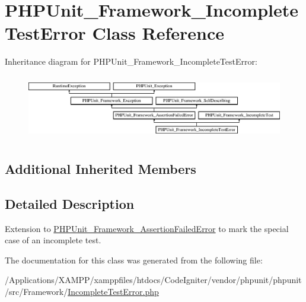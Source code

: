 \hypertarget{class_p_h_p_unit___framework___incomplete_test_error}{}\section{P\+H\+P\+Unit\+\_\+\+Framework\+\_\+\+Incomplete\+Test\+Error Class Reference}
\label{class_p_h_p_unit___framework___incomplete_test_error}
Inheritance diagram for P\+H\+P\+Unit\+\_\+\+Framework\+\_\+\+Incomplete\+Test\+Error\+:\begin{figure}[H]
\begin{center}
\leavevmode
\includegraphics[height=2.860792cm]{class_p_h_p_unit___framework___incomplete_test_error}
\end{center}
\end{figure}
\subsection*{Additional Inherited Members}


\subsection{Detailed Description}
Extension to \mbox{\hyperlink{class_p_h_p_unit___framework___assertion_failed_error}{P\+H\+P\+Unit\+\_\+\+Framework\+\_\+\+Assertion\+Failed\+Error}} to mark the special case of an incomplete test. 

The documentation for this class was generated from the following file\+:\begin{DoxyCompactItemize}
\item 
/\+Applications/\+X\+A\+M\+P\+P/xamppfiles/htdocs/\+Code\+Igniter/vendor/phpunit/phpunit/src/\+Framework/\mbox{\hyperlink{_incomplete_test_error_8php}{Incomplete\+Test\+Error.\+php}}\end{DoxyCompactItemize}
